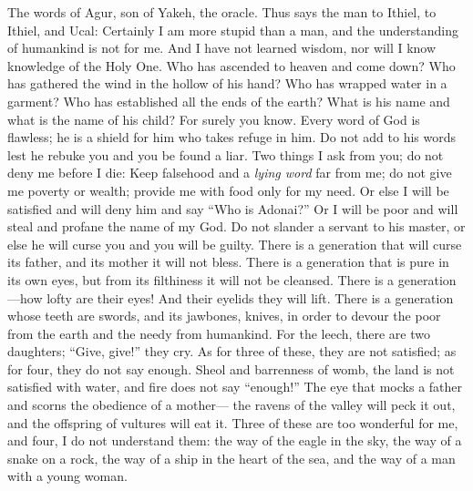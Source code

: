\begin{biblechapter} %
 The words of Agur, son of Yakeh, the oracle. 
Thus says the man to Ithiel, to Ithiel, and Ucal:
\verse Certainly I am more stupid than a man, 
and the understanding of humankind is not for me.
\verse And I have not learned wisdom, 
nor will I know knowledge of the Holy One.
\verse Who has ascended to heaven and come down? 
Who has gathered the wind in the hollow of his hand? 
Who has wrapped water in a garment? 
Who has established all the ends of the earth? 
What is his name and what is the name of his child? 
For surely you know.
\verse Every word of God is flawless; 
he is a shield for him who takes refuge in him.
\verse Do not add to his words 
lest he rebuke you and you be found a liar.
\verse Two things I ask from you; 
do not deny me before I die:
\verse Keep falsehood and a \textit{lying word} far from me; 
do not give me poverty or wealth; 
provide me with food only for my need.
\verse Or else I will be satisfied and will deny him 
and say “Who is Adonai?” 
Or I will be poor and will steal 
and profane the name of my God.
\verse Do not slander a servant to his master, 
or else he will curse you and you will be guilty.
\verse There is a generation that will curse its father, 
and its mother it will not bless.
\verse There is a generation that is pure in its own eyes, 
but from its filthiness it will not be cleansed.
\verse There is a generation—how lofty are their eyes! 
And their eyelids they will lift.
\verse There is a generation whose teeth are swords, 
and its jawbones, knives, 
in order to devour the poor from the earth 
and the needy from humankind.
\verse For the leech, there are two daughters; 
“Give, give!” they cry. 
As for three of these, they are not satisfied; 
as for four, they do not say enough.
\verse Sheol and barrenness of womb, 
the land is not satisfied with water, 
and fire does not say “enough!”
\verse The eye that mocks a father 
and scorns the obedience of a mother— 
the ravens of the valley will peck it out, 
and the offspring of vultures will eat it.
\verse Three of these are too wonderful for me, 
and four, I do not understand them:
\verse the way of the eagle in the sky, 
the way of a snake on a rock, 
the way of a ship in the heart of the sea, 
and the way of a man with a young woman.

\end{biblechapter}
